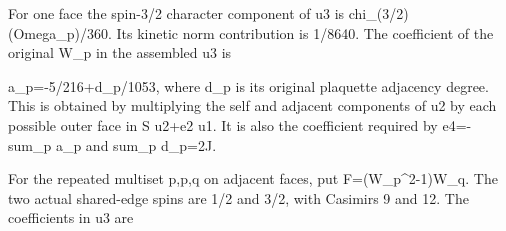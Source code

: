 \documentclass[11pt,a4paper]{article}
\renewcommand{\[}{\begingroup\small\originaldisplaystart}
\renewcommand{\]}{\originaldisplayend\endgroup}
\begin{document}
For one face the spin-3/2 character component of u3 is
{\ttfamily c\allowbreak{}h\allowbreak{}i\allowbreak{}\_\allowbreak{}(\allowbreak{}3\allowbreak{}/\allowbreak{}2\allowbreak{})\allowbreak{}(\allowbreak{}O\allowbreak{}m\allowbreak{}e\allowbreak{}g\allowbreak{}a\allowbreak{}\_\allowbreak{}p\allowbreak{})\allowbreak{}/\allowbreak{}3\allowbreak{}6\allowbreak{}0\allowbreak{}}.
Its kinetic norm contribution is 1/8640. The coefficient of the original
W\_p in the assembled u3 is

\[
 a_p=-5/216+d_p/1053,
\] where d\_p is its original plaquette adjacency degree. This is
obtained by multiplying the self and adjacent components of u2 by each
possible outer face in
{\ttfamily S\allowbreak{} \allowbreak{}u\allowbreak{}2\allowbreak{}+\allowbreak{}e\allowbreak{}2\allowbreak{} \allowbreak{}u\allowbreak{}1\allowbreak{}}.
It is also the coefficient required by
{\ttfamily e\allowbreak{}4\allowbreak{}=\allowbreak{}-\allowbreak{}s\allowbreak{}u\allowbreak{}m\allowbreak{}\_\allowbreak{}p\allowbreak{} \allowbreak{}a\allowbreak{}\_\allowbreak{}p\allowbreak{}}
and
{\ttfamily s\allowbreak{}u\allowbreak{}m\allowbreak{}\_\allowbreak{}p\allowbreak{} \allowbreak{}d\allowbreak{}\_\allowbreak{}p\allowbreak{}=\allowbreak{}2\allowbreak{}J\allowbreak{}}.

For the repeated multiset p,p,q on adjacent faces, put
{\ttfamily F\allowbreak{}=\allowbreak{}(\allowbreak{}W\allowbreak{}\_\allowbreak{}p\allowbreak{}\textasciicircum{}\allowbreak{}2\allowbreak{}-\allowbreak{}1\allowbreak{})\allowbreak{}W\allowbreak{}\_\allowbreak{}q\allowbreak{}}.
The two actual shared-edge spins are 1/2 and 3/2, with Casimirs 9 and
12. The coefficients in u3 are
\end{document}
